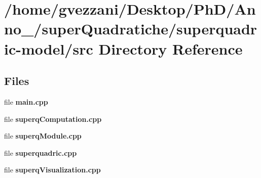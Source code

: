 \section{/home/gvezzani/\-Desktop/\-Ph\-D/\-Anno\-\_/super\-Quadratiche/superquadric-\/model/src Directory Reference}
\label{dir_68267d1309a1af8e8297ef4c3efbcdba}
\subsection*{Files}
\begin{DoxyCompactItemize}
\item 
file {\bfseries main.\-cpp}
\item 
file {\bfseries superq\-Computation.\-cpp}
\item 
file {\bfseries superq\-Module.\-cpp}
\item 
file {\bfseries superquadric.\-cpp}
\item 
file {\bfseries superq\-Visualization.\-cpp}
\end{DoxyCompactItemize}
